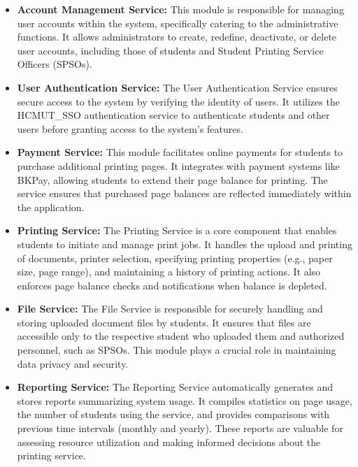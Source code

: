 \begin{itemize}
\item \textbf{Account Management Service:} This module is responsible for managing user accounts within the system, specifically catering to the administrative functions. It allows administrators to create, redefine, deactivate, or delete user accounts, including those of students and Student Printing Service Officers (SPSOs).

\item \textbf{User Authentication Service:} The User Authentication Service ensures secure access to the system by verifying the identity of users. It utilizes the HCMUT\_SSO authentication service to authenticate students and other users before granting access to the system's features.

\item \textbf{Payment Service:} This module facilitates online payments for students to purchase additional printing pages. It integrates with payment systems like BKPay, allowing students to extend their page balance for printing. The service ensures that purchased page balances are reflected immediately within the application.

\item \textbf{Printing Service:} The Printing Service is a core component that enables students to initiate and manage print jobs. It handles the upload and printing of documents, printer selection, specifying printing properties (e.g., paper size, page range), and maintaining a history of printing actions. It also enforces page balance checks and notifications when balance is depleted.

\item \textbf{File Service:} The File Service is responsible for securely handling and storing uploaded document files by students. It ensures that files are accessible only to the respective student who uploaded them and authorized personnel, such as SPSOs. This module plays a crucial role in maintaining data privacy and security.

\item \textbf{Reporting Service:} The Reporting Service automatically generates and stores reports summarizing system usage. It compiles statistics on page usage, the number of students using the service, and provides comparisons with previous time intervals (monthly and yearly). These reports are valuable for assessing resource utilization and making informed decisions about the printing service.
\end{itemize}

